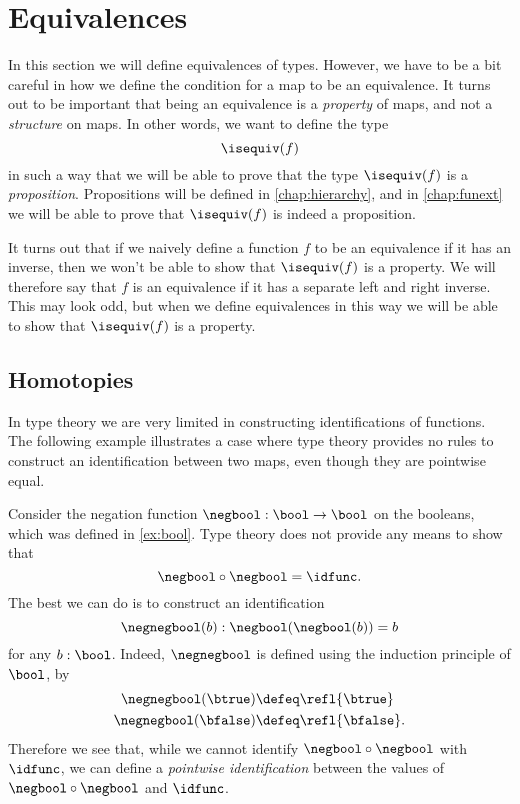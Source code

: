 \section{Equivalences}\label{sec:equivalences}

In this section we will define equivalences of types. However, we have to be a bit careful in how we define the condition for a map to be an equivalence. It turns out to be important that being an equivalence is a \emph{property} of maps, and not a \emph{structure} on maps. In other words, we want to define the type
\begin{equation*}
  \isequiv(f)
\end{equation*}
in such a way that we will be able to prove that the type $\isequiv(f)$ is a \emph{proposition}. Propositions will be defined in \cref{chap:hierarchy}, and in \cref{chap:funext} we will be able to prove that $\isequiv(f)$ is indeed a proposition.

It turns out that if we naively define a function $f$ to be an equivalence if it has an inverse, then we won't be able to show that $\isequiv(f)$ is a property. We will therefore say that $f$ is an equivalence if it has a separate left and right inverse. This may look odd, but when we define equivalences in this way we will be able to show that $\isequiv(f)$ is a property.

\subsection{Homotopies}

In type theory we are very limited in constructing identifications of functions. The following example illustrates a case where type theory provides no rules to construct an identification between two maps, even though they are pointwise equal.

\begin{rmk}\label{rmk:negnegbool}
  Consider the negation function $\negbool : \bool\to\bool$ on the booleans, which was defined in \cref{ex:bool}. Type theory does not provide any means to show that
  \begin{equation*}
    \negbool\circ\negbool=\idfunc.
  \end{equation*}
  The best we can do is to construct an identification
  \begin{equation*}
    \negnegbool(b) : \negbool(\negbool(b))=b
  \end{equation*}
  for any $b:\bool$. Indeed, $\negnegbool$ is defined using the induction principle of $\bool$, by
  \begin{align*}
    \negnegbool(\btrue) & \defeq \refl{\btrue} \\
    \negnegbool(\bfalse) & \defeq \refl{\bfalse}.
  \end{align*}
  Therefore we see that, while we cannot identify $\negbool\circ\negbool$ with $\idfunc$, we can define a \emph{pointwise identification} between the values of $\negbool\circ\negbool$ and $\idfunc$.
\end{rmk}

